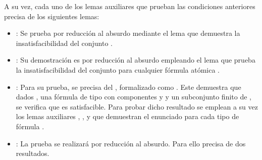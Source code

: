 \begin{isabellebody}
\begin{isamarkuptext}
\begin{enumerate}
    \end{enumerate}
  A su vez, cada uno de los lemas auxiliares que prueban las condiciones anteriores precisa de los
  siguientes lemas:
  \begin{itemize}
    \item {}: Se prueba por reducción al absurdo mediante el lema  que
    demuestra la insatisfacibilidad del conjunto \isa{{\isacharbraceleft}{\isasymbottom}{\isacharbraceright}}.
    \item {}: Su demostración es por reducción al absurdo empleando el lema
     que prueba la insatisfacibilidad del conjunto  para cualquier fórmula
    atómica .
    \item {}: Para su prueba, se precisa del , formalizado como 
    . Este demuestra que dados ,  una fórmula de tipo 
    \isa{{\isasymalpha}} con componentes  y  y  un subconjunto finito de , se verifica que 
     es satisfacible. Para probar dicho resultado se emplean a su vez los lemas
    auxiliares , ,  y 
     que demuestran el enunciado para cada tipo de fórmula \isa{{\isasymalpha}}.
    \item {}: La prueba se realizará por reducción al absurdo. Para ello
    precisa de dos resultados.
    \begin{itemize}

\end{itemize}
\end{itemize}
\end{isamarkuptext}
\end{isabellebody}
